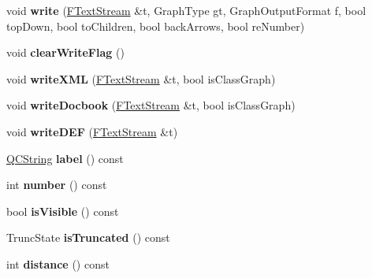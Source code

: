 \begin{DoxyCompactItemize}
\item 
\hypertarget{class_dot_node_adce0e80724a7f8b03d6115c4fb390142}{void {\bfseries write} (\hyperlink{class_f_text_stream}{F\-Text\-Stream} \&t, Graph\-Type gt, Graph\-Output\-Format f, bool top\-Down, bool to\-Children, bool back\-Arrows, bool re\-Number)}\label{class_dot_node_adce0e80724a7f8b03d6115c4fb390142}

\item 
\hypertarget{class_dot_node_a4fdd7ed1077622f2b8875de9ab00444d}{void {\bfseries clear\-Write\-Flag} ()}\label{class_dot_node_a4fdd7ed1077622f2b8875de9ab00444d}

\item 
\hypertarget{class_dot_node_a6e90f9a13417cd8d7989aa73e61ea664}{void {\bfseries write\-X\-M\-L} (\hyperlink{class_f_text_stream}{F\-Text\-Stream} \&t, bool is\-Class\-Graph)}\label{class_dot_node_a6e90f9a13417cd8d7989aa73e61ea664}

\item 
\hypertarget{class_dot_node_ac27bdbadcf320a3d3506f568cdd0392a}{void {\bfseries write\-Docbook} (\hyperlink{class_f_text_stream}{F\-Text\-Stream} \&t, bool is\-Class\-Graph)}\label{class_dot_node_ac27bdbadcf320a3d3506f568cdd0392a}

\item 
\hypertarget{class_dot_node_a7d3f6914c7a8c359003d9ad36c908905}{void {\bfseries write\-D\-E\-F} (\hyperlink{class_f_text_stream}{F\-Text\-Stream} \&t)}\label{class_dot_node_a7d3f6914c7a8c359003d9ad36c908905}

\item 
\hypertarget{class_dot_node_a9205822f6142d072844690dc09ab24bd}{\hyperlink{class_q_c_string}{Q\-C\-String} {\bfseries label} () const }\label{class_dot_node_a9205822f6142d072844690dc09ab24bd}

\item 
\hypertarget{class_dot_node_a45ddffab98cef97adf64bf713afd1a12}{int {\bfseries number} () const }\label{class_dot_node_a45ddffab98cef97adf64bf713afd1a12}

\item 
\hypertarget{class_dot_node_a08422ee75ab02691943c1ca87e2bc563}{bool {\bfseries is\-Visible} () const }\label{class_dot_node_a08422ee75ab02691943c1ca87e2bc563}

\item 
\hypertarget{class_dot_node_a7b0dc639fcc936ff39af0ed97d6891d4}{Trunc\-State {\bfseries is\-Truncated} () const }\label{class_dot_node_a7b0dc639fcc936ff39af0ed97d6891d4}

\item 
\hypertarget{class_dot_node_a206378a631dd19fec079641bc058632d}{int {\bfseries distance} () const }\label{class_dot_node_a206378a631dd19fec079641bc058632d}

\end{DoxyCompactItemize}
